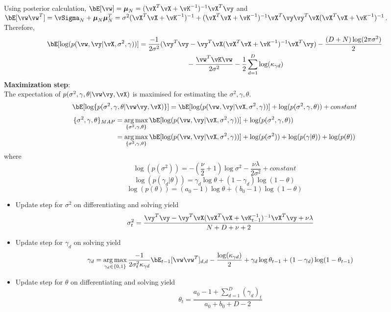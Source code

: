 \documentclass[a4paper,11pt]{article}
\begin{document}
\begin{pmisolution}
\begin{enumerate}
\begin{align*}
    \end{align*}
    Using posterior calculation,
    \(\bE[\vw] = \boldsymbol\mu_N = (\vX^T\vX + \vK^{-1})^{-1}\vX^T\vy\) and \(\bE[\vw\vw^T] = \vSigma_N + \boldsymbol\mu_N\boldsymbol\mu_{N}^{T}= \sigma^2(\vX^T\vX + \vK^{-1})^{-1} + (\vX^T\vX + \vK^{-1})^{-1}\vX^T\vy\vy^T\vX(\vX^T\vX + \vK^{-1})^{-1}\).\\
    Therefore,
    \begin{align*}
        \bE[\log(p(\vw,\vy|\vX,\sigma^2,\gamma))] &= \frac{-1}{2\sigma^2}(\vy^T\vy - \vy^T\vX(\vX^T\vX + \vK^{-1})^{-1}\vX^T\vy) - \frac{(D+N)\log(2\pi\sigma^2)}{2}\\
         & \hspace{7em} -\frac{\vw^T\vK\vw}{2\sigma^2} - \frac{1}{2}\sum_{d=1}^{D}\log (\kappa_{\gamma d})\\
    \end{align*}
    \textbf{Maximization step}:\\ The expectation of \(p(\sigma^2,\gamma,\theta|\vw\vy,\vX)\) is maximised for estimating the \(\sigma^2,\gamma,\theta\).\\
    \[\bE[\log\{p(\sigma^2,\gamma,\theta|\vw\vy,\vX)\}] = \bE[\log(p(\vw,\vy|\vX,\sigma^2,\gamma))] + \log(p(\sigma^2,\gamma,\theta)) + constant\]
    \begin{align*}
        \{\sigma^2,\gamma,\theta\}_{MAP} &= \argmax_{\{\sigma^2,\gamma,\theta\}} \bE[\log(p(\vw,\vy|\vX,\sigma^2,\gamma))] + \log(p(\sigma^2,\gamma,\theta))\\
        &= \argmax_{\{\sigma^2,\gamma,\theta\}} \bE[\log(p(\vw,\vy|\vX,\sigma^2,\gamma))] + \log(p(\sigma^2))+\log(p(\gamma|\theta)) + \log(p(\theta))\\
    \end{align*}
    where 
    \[\log(p(\sigma^2)) = -(\frac{\nu}{2}+1)\log\sigma^2 - \frac{\nu\lambda}{2\sigma^2} + constant\]
    \[\log(p(\gamma_d|\theta)) = \gamma_d\log\theta + (1 - \gamma_d)\log(1-\theta)\]
    \[\log(p(\theta)) = (a_0 - 1)\log\theta + (b_0 - 1)\log(1 - \theta)\]
    \begin{itemize}
        \item Update step for \(\sigma^2\) on differentiating and solving yield\\
        \[\sigma^2_t = \frac{\vy^T\vy - \vy^T\vX(\vX^T\vX + \vK^{-1}_{t-1})^{-1}\vX^T\vy + \nu\lambda}{N + D + \nu + 2}\]
        \item Update step for \(\gamma_d\) on solving yield\\
        \[\gamma_d = \argmax_{\gamma_d\in\{0,1\}} \frac{-1}{2\sigma^2_{t}\kappa_{\gamma d}}\bE_{t-1}[\vw\vw^T]_{d,d} - \frac{\log(\kappa_{\gamma d})}{2} + \gamma_d\log\theta_{t-1} + (1 - \gamma_d)\log(1-\theta_{t-1})\]
        \item Update step for \(\theta\) on differentiating and solving yield\\
        \[\theta_t = \frac{a_0 - 1 + \sum_{d=1}^{D}(\gamma_d)_t}{a_0 + b_0 + D - 2}\]
    \end{itemize}
\end{enumerate}

\end{pmisolution}
\end{document}
